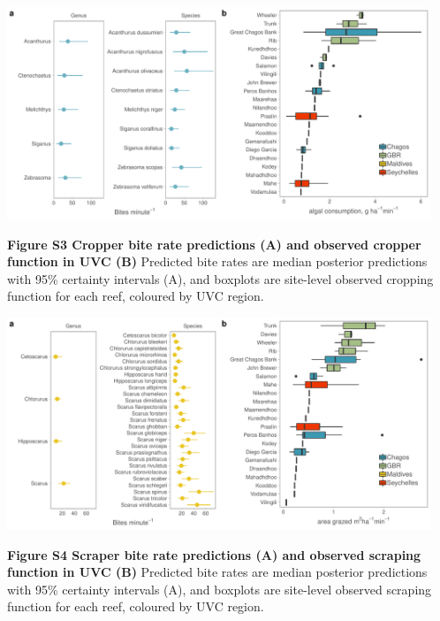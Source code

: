 \documentclass[12pt,]{article}
\begin{document}
\begin{center}\includegraphics[width=480px]{../../figures/FigureS2_cropper_bites} \end{center}

\textbf{Figure S3 \textbar{} Cropper bite rate predictions (A) and
observed cropper function in UVC (B)} Predicted bite rates are median
posterior predictions with 95\% certainty intervals (A), and boxplots
are site-level observed cropping function for each reef, coloured by UVC
region.

\newpage

\begin{center}\includegraphics[width=480px]{../../figures/FigureS3_scraper_bites} \end{center}

\textbf{Figure S4 \textbar{} Scraper bite rate predictions (A) and
observed scraping function in UVC (B)} Predicted bite rates are median
posterior predictions with 95\% certainty intervals (A), and boxplots
are site-level observed scraping function for each reef, coloured by UVC
region.

\newpage
\end{document}
